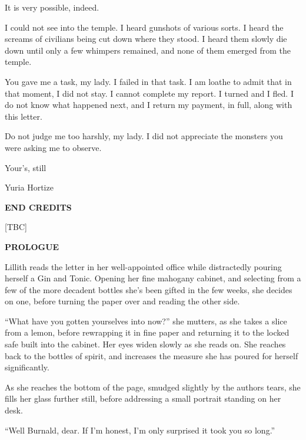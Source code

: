 It is very possible, indeed.\medskip

I could not see into the temple. I heard gunshots of various sorts. I heard the screams of civilians being cut down where they stood. I heard them slowly die down until only a few whimpers remained, and none of them emerged from the temple.\medskip

You gave me a task, my lady. I failed in that task. I am loathe to admit that in that moment, I did not stay. I cannot complete my report. I turned and I fled. I do not know what happened next, and I return my payment, in full, along with this letter.\medskip

Do not judge me too harshly, my lady. I did not appreciate the monsters you were asking me to observe.\medskip

Your’s, still\medskip

Yuria Hortize\medskip

\textbf{END CREDITS}\medskip

[TBC]\medskip

\textbf{PROLOGUE}\medskip

Lillith reads the letter in her well-appointed office while distractedly pouring herself a Gin and Tonic. Opening her fine mahogany cabinet, and selecting from a few of the more decadent bottles she’s been gifted in the few weeks, she decides on one, before turning the paper over and reading the other side.\medskip

“What have you gotten yourselves into now?” she mutters, as she takes a slice from a lemon, before rewrapping it in fine paper and returning it to the locked safe built into the cabinet. Her eyes widen slowly as she reads on. She reaches back to the bottles of spirit, and increases the measure she has poured for herself significantly.\medskip

As she reaches the bottom of the page, smudged slightly by the authors tears, she fills her glass further still, before addressing a small portrait standing on her desk.\medskip

“Well Burnald, dear. If I'm honest, I’m only surprised it took you so long.”\medskip

%

\clearpage

